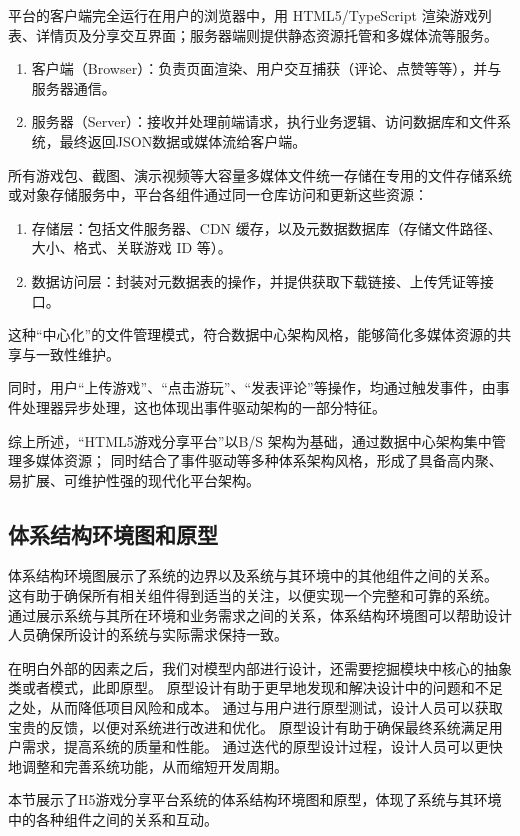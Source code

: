 \documentclass[12pt]{ctexart} %
\begin{document}
平台的客户端完全运行在用户的浏览器中，用 HTML5/TypeScript 渲染游戏列表、详情页及分享交互界面；服务器端则提供静态资源托管和多媒体流等服务。
\begin{enumerate}
  \item 客户端（Browser）：负责页面渲染、用户交互捕获（评论、点赞等等），并与服务器通信。
  \item 服务器（Server）：接收并处理前端请求，执行业务逻辑、访问数据库和文件系统，最终返回JSON数据或媒体流给客户端。
\end{enumerate}

所有游戏包、截图、演示视频等大容量多媒体文件统一存储在专用的文件存储系统或对象存储服务中，平台各组件通过同一仓库访问和更新这些资源：
\begin{enumerate}
  \item 存储层：包括文件服务器、CDN 缓存，以及元数据数据库（存储文件路径、大小、格式、关联游戏 ID 等）。
  \item 数据访问层：封装对元数据表的操作，并提供获取下载链接、上传凭证等接口。
\end{enumerate}

这种“中心化”的文件管理模式，符合数据中心架构风格，能够简化多媒体资源的共享与一致性维护。

同时，用户“上传游戏”、“点击游玩”、“发表评论”等操作，均通过触发事件，由事件处理器异步处理，这也体现出事件驱动架构的一部分特征。

综上所述，“HTML5游戏分享平台”以B/S 架构为基础，通过数据中心架构集中管理多媒体资源；
同时结合了事件驱动等多种体系架构风格，形成了具备高内聚、易扩展、可维护性强的现代化平台架构。

\subsection{体系结构环境图和原型}
体系结构环境图展示了系统的边界以及系统与其环境中的其他组件之间的关系。
这有助于确保所有相关组件得到适当的关注，以便实现一个完整和可靠的系统。
通过展示系统与其所在环境和业务需求之间的关系，体系结构环境图可以帮助设计人员确保所设计的系统与实际需求保持一致。

在明白外部的因素之后，我们对模型内部进行设计，还需要挖掘模块中核心的抽象类或者模式，此即原型。
原型设计有助于更早地发现和解决设计中的问题和不足之处，从而降低项目风险和成本。
通过与用户进行原型测试，设计人员可以获取宝贵的反馈，以便对系统进行改进和优化。
原型设计有助于确保最终系统满足用户需求，提高系统的质量和性能。
通过迭代的原型设计过程，设计人员可以更快地调整和完善系统功能，从而缩短开发周期。

本节展示了H5游戏分享平台系统的体系结构环境图和原型，体现了系统与其环境中的各种组件之间的关系和互动。
\end{document}
